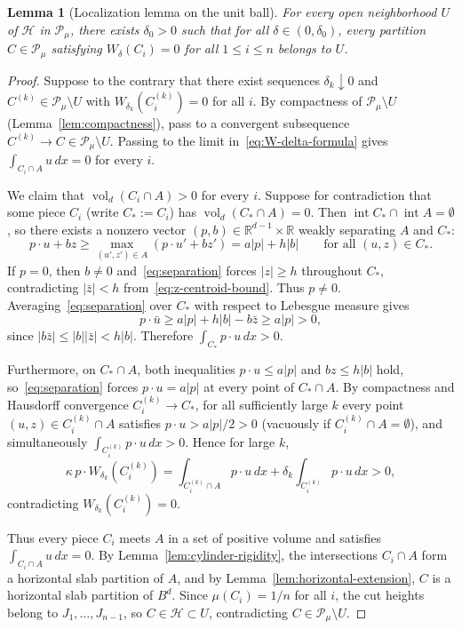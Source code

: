 \documentclass[11pt,a4paper]{amsart}
\numberwithin{equation}{section}
\newtheorem{lemma}[theorem]{Lemma}
\theoremstyle{definition}
\newcommand{\R}{\mathbb{R}}
\newcommand{\Pcal}{\mathcal{P}}
\newcommand{\Hcal}{\mathcal{H}}
\newcommand{\inte}{\operatorname{int}}
\newcommand{\vol}{\operatorname{vol}}
\begin{document}
\begin{lemma}[Localization lemma on the unit ball]
\label{lem:localization}
For every open neighborhood $U$ of $\Hcal$ in $\Pcal_\mu$, there exists $\delta_0 > 0$ such that for all $\delta \in (0, \delta_0)$, every partition $C \in \Pcal_\mu$ satisfying $W_\delta(C_i) = 0$ for all $1 \le i \le n$ belongs to $U$.
\end{lemma}

\begin{proof}
Suppose to the contrary that there exist sequences $\delta_k \downarrow 0$ and $C^{(k)} \in \Pcal_\mu \setminus U$ with $W_{\delta_k}(C_i^{(k)}) = 0$ for all $i$. By compactness of $\Pcal_\mu \setminus U$ (Lemma~\ref{lem:compactness}), pass to a convergent subsequence $C^{(k)} \to C \in \Pcal_\mu \setminus U$. Passing to the limit in~\eqref{eq:W-delta-formula} gives $\int_{C_i \cap A} u \, dx = 0$ for every $i$.

We claim that $\vol_d(C_i \cap A) > 0$ for every $i$. Suppose for contradiction that some piece $C_i$ (write $C_* := C_i$) has $\vol_d(C_* \cap A) = 0$. Then $\inte C_* \cap \inte A = \emptyset$, so there exists a nonzero vector $(p, b) \in \R^{d-1} \times \R$ weakly separating $A$ and $C_*$:
\begin{equation}
\label{eq:separation}
p \cdot u + b z \ge \max_{(u',z') \in A} (p \cdot u' + b z') = a |p| + h |b| \qquad \text{for all } (u, z) \in C_*.
\end{equation}
If $p = 0$, then $b \ne 0$ and~\eqref{eq:separation} forces $|z| \ge h$ throughout $C_*$, contradicting $|\bar z| < h$ from~\eqref{eq:z-centroid-bound}. Thus $p \ne 0$. Averaging~\eqref{eq:separation} over $C_*$ with respect to Lebesgue measure gives
\[
p \cdot \bar u \ge a |p| + h |b| - b \bar z \ge a |p| > 0,
\]
since $|b \bar z| \le |b| |\bar z| < h |b|$. Therefore $\int_{C_*} p \cdot u \, dx > 0$.

Furthermore, on $C_* \cap A$, both inequalities $p \cdot u \le a |p|$ and $b z \le h |b|$ hold, so~\eqref{eq:separation} forces $p \cdot u = a |p|$ at every point of $C_* \cap A$. By compactness and Hausdorff convergence $C_i^{(k)} \to C_*$, for all sufficiently large $k$ every point $(u, z) \in C_i^{(k)} \cap A$ satisfies $p \cdot u > a |p|/2 > 0$ (vacuously if $C_i^{(k)} \cap A = \emptyset$), and simultaneously $\int_{C_i^{(k)}} p \cdot u \, dx > 0$. Hence for large $k$,
\[
\kappa\, p \cdot W_{\delta_k}(C_i^{(k)}) = \int_{C_i^{(k)} \cap A} p \cdot u \, dx + \delta_k \int_{C_i^{(k)}} p \cdot u \, dx > 0,
\]
contradicting $W_{\delta_k}(C_i^{(k)}) = 0$.

Thus every piece $C_i$ meets $A$ in a set of positive volume and satisfies $\int_{C_i \cap A} u \, dx = 0$. By Lemma~\ref{lem:cylinder-rigidity}, the intersections $C_i \cap A$ form a horizontal slab partition of $A$, and by Lemma~\ref{lem:horizontal-extension}, $C$ is a horizontal slab partition of $B^d$. Since $\mu(C_i) = 1/n$ for all $i$, the cut heights belong to $J_1, \dots, J_{n-1}$, so $C \in \Hcal \subset U$, contradicting $C \in \Pcal_\mu \setminus U$.
\end{proof}
\end{document}
